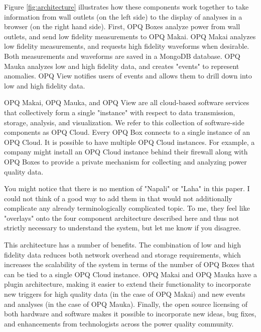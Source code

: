 Figure \ref{fig:architecture} illustrates how these components work together to take information from wall outlets (on the left side) to the display of analyses in a browser (on the right hand side).  First, OPQ Boxes analyze power from wall outlets, and send low fidelity measurements to OPQ Makai. OPQ Makai analyzes low fidelity measurements, and requests high fidelity waveforms when desirable. Both measurements and waveforms are saved in a MongoDB database. OPQ Mauka analyzes low and high fidelity data, and creates "events" to represent anomalies. OPQ View notifies users of events and allows them to drill down into low and high fidelity data.

OPQ Makai, OPQ Mauka, and OPQ View are all cloud-based software services that collectively form a single "instance" with respect to data transmission, storage, analysis, and visualization. We refer to this collection of software-side components as OPQ Cloud. Every OPQ Box connects to a single instance of an OPQ Cloud. It is possible to have multiple OPQ Cloud instances. For example, a company might install an OPQ Cloud instance behind their firewall along with OPQ Boxes to provide a private mechanism for collecting and analyzing power quality data.

\begin{tcolorbox}[title=ANTHONY AND SERGE]
You might notice that there is no mention of "Napali" or "Laha" in this paper. I could not think of a good way to add them in that would not additionally complicate any already terminologically complicated topic. To me, they feel like "overlays" onto the four component architecture described here and thus not strictly necessary to understand the system, but let me know if you disagree.
\end{tcolorbox}


This architecture has a number of benefits. The combination of low and high fidelity data reduces both network overhead and storage requirements, which increases the scalability of the system in terms of the number of OPQ Boxes that can be tied to a single OPQ Cloud instance. OPQ Makai and OPQ Mauka have a plugin architecture, making it easier to extend their functionality to incorporate new triggers for high quality data (in the case of OPQ Makai) and new events and analyses (in the case of OPQ Mauka). Finally, the open source licensing of both hardware and software makes it possible to incorporate new ideas, bug fixes, and enhancements from technologists across the power quality community.

